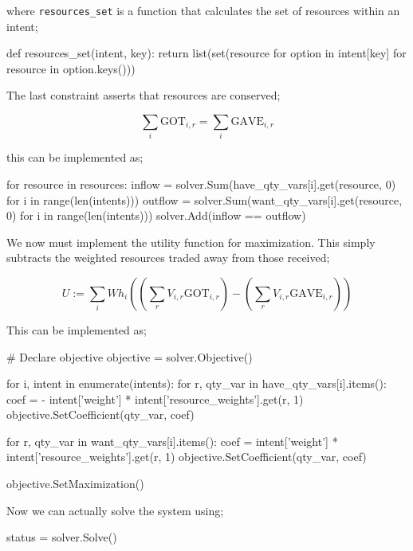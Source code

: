 where \verb|resources_set| is a function that calculates the set of resources within an intent;


\begin{betterpython}
def resources_set(intent, key):
    return list(set(resource for option in intent[key] for resource in option.keys()))
\end{betterpython}

The last constraint asserts that resources are conserved;

\begin{equation}
    \sum_{i} \text{GOT}_{i, r} = \sum_{i} \text{GAVE}_{i, r}
\end{equation}

this can be implemented as;

\begin{betterpython}
for resource in resources:
    inflow = solver.Sum(have_qty_vars[i].get(resource, 0) for i in range(len(intents)))
    outflow = solver.Sum(want_qty_vars[i].get(resource, 0) for i in range(len(intents)))
    solver.Add(inflow == outflow)
\end{betterpython}

We now must implement the utility function for maximization. This simply subtracts the weighted resources traded away from those received;

\begin{equation}
    U := \sum_i Wh_i \left(\left(\sum_r V_{i, r} \text{GOT}_{i, r}\right) - \left(\sum_r V_{i, r} \text{GAVE}_{i, r}\right)\right)
\end{equation}

This can be implemented as;

\begin{betterpython}
# Declare objective
objective = solver.Objective()

for i, intent in enumerate(intents):
    for r, qty_var in have_qty_vars[i].items():
        coef = - intent['weight'] * intent['resource_weights'].get(r, 1)
        objective.SetCoefficient(qty_var, coef)

    for r, qty_var in want_qty_vars[i].items():
        coef = intent['weight'] * intent['resource_weights'].get(r, 1)
        objective.SetCoefficient(qty_var, coef)

objective.SetMaximization()
\end{betterpython}

Now we can actually solve the system using;


\begin{betterpython}
status = solver.Solve()
\end{betterpython}


